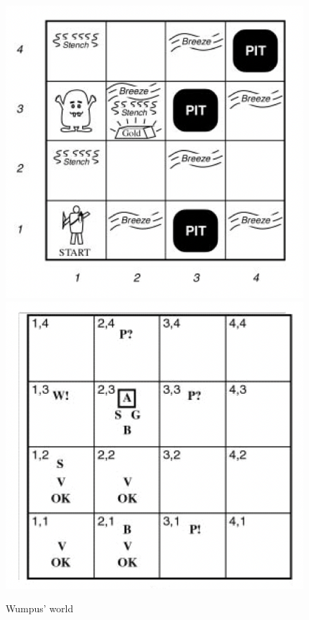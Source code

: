 \documentclass{article}
\begin{document}
\begin{figure}[h!]
\centering
\includegraphics[scale=0.5]{Images/wumpus_a.png}
\includegraphics[scale=0.5]{Images/wumpus_b.png}
\caption{Wumpus' world}
\end{figure}
\end{document}
